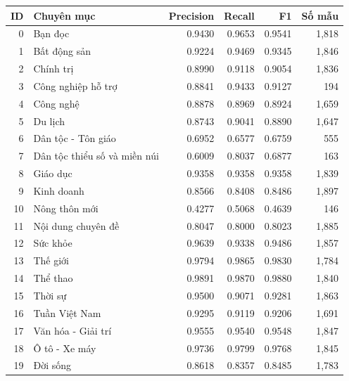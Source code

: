 \begin{tabularx}{\linewidth}{r>{\raggedright\arraybackslash}Xrrrr}
\toprule
ID & Chuyên mục & Precision & Recall & F1 & Số mẫu\\\midrule
0 & Bạn đọc & 0.9430 & 0.9653 & 0.9541 & 1,818\\
1 & Bất động sản & 0.9224 & 0.9469 & 0.9345 & 1,846\\
2 & Chính trị & 0.8990 & 0.9118 & 0.9054 & 1,836\\
3 & Công nghiệp hỗ trợ & 0.8841 & 0.9433 & 0.9127 & 194\\
4 & Công nghệ & 0.8878 & 0.8969 & 0.8924 & 1,659\\
5 & Du lịch & 0.8743 & 0.9041 & 0.8890 & 1,647\\
6 & Dân tộc - Tôn giáo & 0.6952 & 0.6577 & 0.6759 & 555\\
7 & Dân tộc thiểu số và miền núi & 0.6009 & 0.8037 & 0.6877 & 163\\
8 & Giáo dục & 0.9358 & 0.9358 & 0.9358 & 1,839\\
9 & Kinh doanh & 0.8566 & 0.8408 & 0.8486 & 1,897\\
10 & Nông thôn mới & 0.4277 & 0.5068 & 0.4639 & 146\\
11 & Nội dung chuyên đề & 0.8047 & 0.8000 & 0.8023 & 1,885\\
12 & Sức khỏe & 0.9639 & 0.9338 & 0.9486 & 1,857\\
13 & Thế giới & 0.9794 & 0.9865 & 0.9830 & 1,784\\
14 & Thể thao & 0.9891 & 0.9870 & 0.9880 & 1,840\\
15 & Thời sự & 0.9500 & 0.9071 & 0.9281 & 1,863\\
16 & Tuần Việt Nam & 0.9295 & 0.9119 & 0.9206 & 1,691\\
17 & Văn hóa - Giải trí & 0.9555 & 0.9540 & 0.9548 & 1,847\\
18 & Ô tô - Xe máy & 0.9736 & 0.9799 & 0.9768 & 1,845\\
19 & Đời sống & 0.8618 & 0.8357 & 0.8485 & 1,783\\
\bottomrule\end{tabularx}
